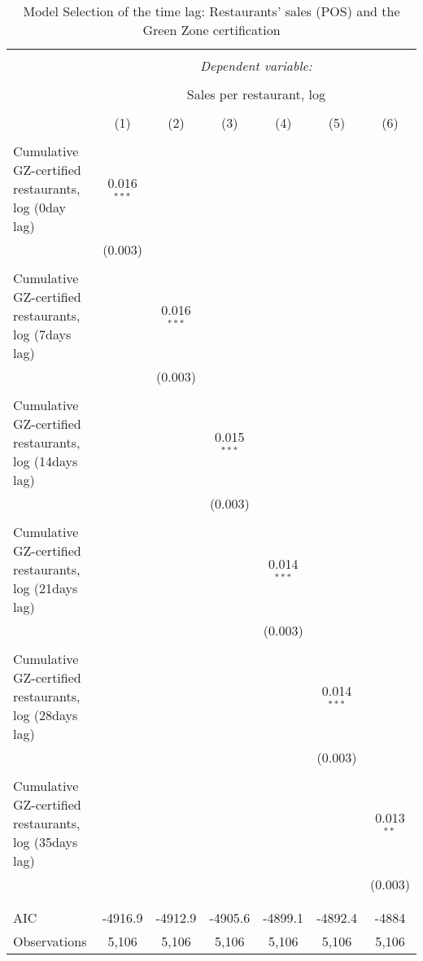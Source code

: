 
\begin{table}[!htbp] \centering 
  \caption{Model Selection of the time lag: Restaurants' sales (POS) and the Green Zone certification} 
  \label{} 
\scriptsize 
\begin{tabular}{@{\extracolsep{1pt}}lcccccc} 
\\[-1.8ex]\hline 
\hline \\[-1.8ex] 
 & \multicolumn{6}{c}{\textit{Dependent variable:}} \\ 
\cline{2-7} 
\\[-1.8ex] & \multicolumn{6}{c}{Sales per restaurant, log} \\ 
\\[-1.8ex] & (1) & (2) & (3) & (4) & (5) & (6)\\ 
\hline \\[-1.8ex] 
 Cumulative GZ-certified restaurants, log (0day lag) & 0.016$^{***}$ &  &  &  &  &  \\ 
  & (0.003) &  &  &  &  &  \\ 
  & & & & & & \\ 
 Cumulative GZ-certified restaurants, log (7days lag) &  & 0.016$^{***}$ &  &  &  &  \\ 
  &  & (0.003) &  &  &  &  \\ 
  & & & & & & \\ 
 Cumulative GZ-certified restaurants, log (14days lag) &  &  & 0.015$^{***}$ &  &  &  \\ 
  &  &  & (0.003) &  &  &  \\ 
  & & & & & & \\ 
 Cumulative GZ-certified restaurants, log (21days lag) &  &  &  & 0.014$^{***}$ &  &  \\ 
  &  &  &  & (0.003) &  &  \\ 
  & & & & & & \\ 
 Cumulative GZ-certified restaurants, log (28days lag) &  &  &  &  & 0.014$^{***}$ &  \\ 
  &  &  &  &  & (0.003) &  \\ 
  & & & & & & \\ 
 Cumulative GZ-certified restaurants, log (35days lag) &  &  &  &  &  & 0.013$^{**}$ \\ 
  &  &  &  &  &  & (0.003) \\ 
  & & & & & & \\ 
\hline \\[-1.8ex] 
AIC & -4916.9 & -4912.9 & -4905.6 & -4899.1 & -4892.4 & -4884 \\ 
Observations & 5,106 & 5,106 & 5,106 & 5,106 & 5,106 & 5,106 \\ 

\end{tabular}
\end{table}
